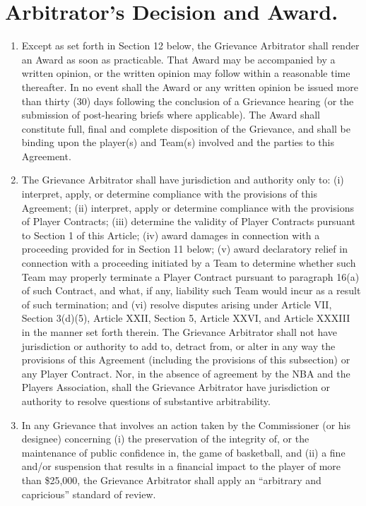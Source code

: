 \documentclass[
]{book}
\providecommand{\tightlist}{%
  \setlength{\itemsep}{0pt}\setlength{\parskip}{0pt}}
\begin{document}
\hypertarget{arbitrators-decision-and-award.}{%
\section{Arbitrator's Decision and Award.}\label{arbitrators-decision-and-award.}}

\begin{enumerate}
\def\labelenumi{(\alph{enumi})}
\tightlist
\item
  Except as set forth in Section 12 below, the Grievance Arbitrator shall render an Award as soon as practicable. That Award may be accompanied by a written opinion, or the written opinion may follow within a reasonable time thereafter. In no event shall the Award or any written opinion be issued more than thirty (30) days following the conclusion of a Grievance hearing (or the submission of post-hearing briefs where applicable). The Award shall constitute full, final and complete disposition of the Grievance, and shall be binding upon the player(s) and Team(s) involved and the parties to this Agreement.
\item
  The Grievance Arbitrator shall have jurisdiction and authority only to: (i) interpret, apply, or determine compliance with the provisions of this Agreement; (ii) interpret, apply or determine compliance with the provisions of Player Contracts; (iii) determine the validity of Player Contracts pursuant to Section 1 of this Article; (iv) award damages in connection with a proceeding provided for in Section 11 below; (v) award declaratory relief in connection with a proceeding initiated by a Team to determine whether such Team may properly terminate a Player Contract pursuant to paragraph 16(a) of such Contract, and what, if any, liability such Team would incur as a result of such termination; and (vi) resolve disputes arising under Article VII, Section 3(d)(5), Article XXII, Section 5, Article XXVI, and Article XXXIII in the manner set forth therein. The Grievance Arbitrator shall not have jurisdiction or authority to add to, detract from, or alter in any way the provisions of this Agreement (including the provisions of this subsection) or any Player Contract. Nor, in the absence of agreement by the NBA and the Players Association, shall the Grievance Arbitrator have jurisdiction or authority to resolve questions of substantive arbitrability.
\item
  In any Grievance that involves an action taken by the Commissioner (or his designee) concerning (i) the preservation of the integrity of, or the maintenance of public confidence in, the game of basketball, and (ii) a fine and/or suspension that results in a financial impact to the player of more than \$25,000, the Grievance Arbitrator shall apply an ``arbitrary and capricious'' standard of review.
\end{enumerate}
\end{document}
